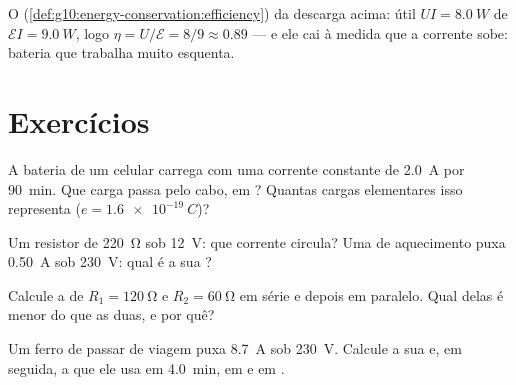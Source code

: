 \begin{example}\label{ex:g11:circuits-and-power:efficiency}
O  (\cref{def:g10:energy-conservation:efficiency}) da descarga
acima: útil $UI = \qty{8.0}{W}$ de $\mathcal{E}I = \qty{9.0}{W}$, logo
$\eta = U/\mathcal{E} = 8/9 \approx 0.89$ --- e ele cai à medida que a
corrente sobe: bateria que trabalha muito esquenta.
\end{example}

\section{Exercícios}

\begin{exercise}[$\star$]\label{exo:g11:circuits-and-power:1}
A bateria de um celular carrega com uma corrente constante de
\qty{2.0}{A} por \qty{90}{min}. Que carga passa pelo cabo, em ?
Quantas cargas elementares isso representa ($e = \qty{1.6e-19}{C}$)?
\end{exercise}

\begin{exercise}[$\star$]\label{exo:g11:circuits-and-power:2}
Um resistor de \qty{220}{\ohm} sob \qty{12}{V}: que corrente circula? Uma
 de aquecimento puxa \qty{0.50}{A} sob \qty{230}{V}: qual é a
sua ?
\end{exercise}

\begin{exercise}[$\star$]\label{exo:g11:circuits-and-power:3}
Calcule a  de $R_1 = \qty{120}{\ohm}$ e
$R_2 = \qty{60}{\ohm}$ em série e depois em paralelo. Qual delas é menor
do que as duas, e por quê?
\end{exercise}

\begin{exercise}[$\star$]\label{exo:g11:circuits-and-power:4}
Um ferro de passar de viagem puxa \qty{8.7}{A} sob \qty{230}{V}. Calcule
a sua  e, em seguida, a  que ele usa em \qty{4.0}{min}, em
 e em .
\end{exercise}

